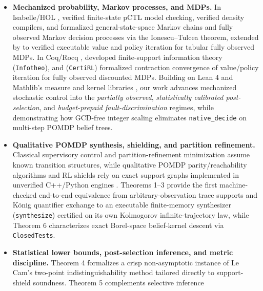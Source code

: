 \documentclass[11pt,a4paper]{article}
\providecommand{\tightlist}{\setlength{\itemsep}{2pt}\setlength{\parskip}{0pt}}
\begin{document}
\begin{itemize}
\tightlist
\item
  \textbf{Mechanized probability, Markov processes, and MDPs.} In
  Isabelle/HOL \citep{nipkowPaulsonWenzel2002}, \citet{hoelzlNipkow2012}
  verified finite-state pCTL model checking, \citet{eberl2015} verified
  density compilers, and \citet{hoelzl2017} formalized
  general-state-space Markov chains and fully observed Markov decision
  processes via the Ionescu--Tulcea theorem, extended by
  \citet{schaeffelerAbdulaziz2023} to verified executable value and
  policy iteration for tabular fully observed MDPs. In Coq/Rocq
  \citep{bertotCasteran2004}, \citet{affeldt2014} developed
  finite-support information theory (\texttt{Infotheo}), and
  \citet{vajjha2021} (\texttt{CertiRL}) formalized contraction
  convergence of value/policy iteration for fully observed discounted
  MDPs. Building on Lean 4 \citep{mouraUllrich2021} and Mathlib's
  measure and kernel libraries \citep{mathlib2020}, our work advances
  mechanized stochastic control into the \emph{partially observed},
  \emph{statistically calibrated post-selection}, and
  \emph{budget-prepaid fault-discrimination} regimes, while
  demonstrating how GCD-free integer scaling eliminates
  \texttt{native\_decide} on multi-step POMDP belief trees.
\item
  \textbf{Qualitative POMDP synthesis, shielding, and partition
  refinement.} Classical supervisory control
  \citep{ramadgeWonham1987, cassandrasLafortune2021} and
  partition-refinement minimization
  \citep{paigeTarjan1987, givanDeanGreig2003} assume known transition
  structures, while qualitative POMDP parity/reachability algorithms
  \citep{chatterjee2016, junges2021} and RL shields \citep{alshiekh2018}
  rely on exact support graphs implemented in unverified C++/Python
  engines \citep{kwiatkowska2011, dehnert2017}. Theorems 1--3 provide
  the first machine-checked end-to-end equivalence from
  arbitrary-observation trace supports and König quantifier exchange to
  an executable finite-memory synthesizer (\texttt{synthesize})
  certified on its own Kolmogorov infinite-trajectory law, while Theorem
  6 characterizes exact Borel-space belief-kernel descent via
  \texttt{ClosedTests}.
\item
  \textbf{Statistical lower bounds, post-selection inference, and metric
  discipline.} Theorem 4 formalizes a crisp non-asymptotic instance of
  Le Cam's two-point indistinguishability method
  \citep{leCam1973, tsybakov2009} tailored directly to support-shield
  soundness. Theorem 5 complements selective inference \citep{berk2013}

\end{itemize}
\end{document}
